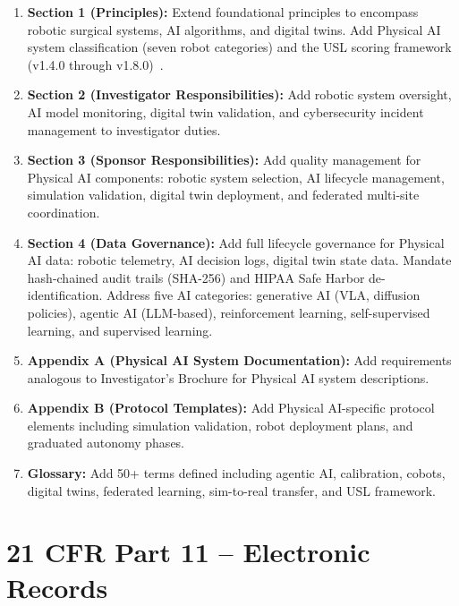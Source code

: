 \begin{enumerate}[label=(\alph*)]
\item \textbf{Section 1 (Principles):} Extend foundational principles to
  encompass robotic surgical systems, AI algorithms, and digital twins.
  Add Physical AI system classification (seven robot categories) and the USL
  scoring framework (v1.4.0 through v1.8.0)~\cite{usl2026}.

\item \textbf{Section 2 (Investigator Responsibilities):} Add robotic system
  oversight, AI model monitoring, digital twin validation, and cybersecurity
  incident management to investigator duties.

\item \textbf{Section 3 (Sponsor Responsibilities):} Add quality management
  for Physical AI components: robotic system selection, AI lifecycle
  management, simulation validation, digital twin deployment, and federated
  multi-site coordination.

\item \textbf{Section 4 (Data Governance):} Add full lifecycle governance for
  Physical AI data: robotic telemetry, AI decision logs, digital twin state
  data. Mandate hash-chained audit trails (SHA-256) and HIPAA Safe Harbor
  de-identification. Address five AI categories: generative AI (VLA, diffusion
  policies), agentic AI (LLM-based), reinforcement learning, self-supervised
  learning, and supervised learning.

\item \textbf{Appendix A (Physical AI System Documentation):} Add requirements
  analogous to Investigator's Brochure for Physical AI system descriptions.

\item \textbf{Appendix B (Protocol Templates):} Add Physical AI-specific
  protocol elements including simulation validation, robot deployment plans,
  and graduated autonomy phases.

\item \textbf{Glossary:} Add 50+ terms defined including agentic AI,
  calibration, cobots, digital twins, federated learning, sim-to-real
  transfer, and USL framework.
\end{enumerate}

\section{21 CFR Part 11 -- Electronic Records}

